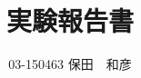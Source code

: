 \documentclass[uplatex,dvipdfmx]{jsarticle}
\begin{document}
\title{実験報告書}
\author{03-150463 保田　和彦}
\maketitle


\end{document}
